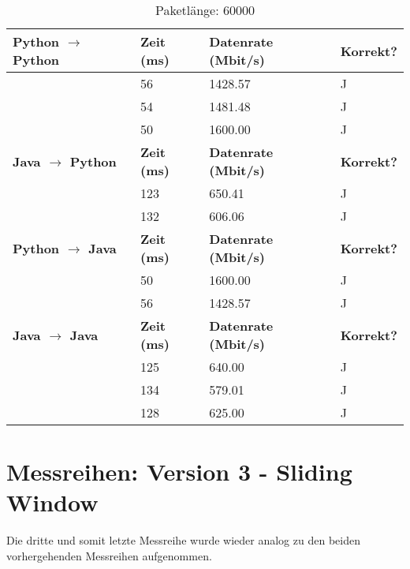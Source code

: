 \documentclass{article}
\begin{document}
    \begin{table}[]
        \caption{Paketlänge: 60000}
        \label{tab:my-tablev2_60000}
        \begin{tabular}{|l|l|l|l|}
            \hline
            \textbf{Python $\rightarrow$ Python} & \textbf{Zeit (ms)} & \textbf{Datenrate (Mbit/s)} & \textbf{Korrekt?} \\ \hline
            & 56       & 1428.57         & J        \\ \cline{2-4}
            & 54       & 1481.48         & J        \\ \cline{2-4}
            & 50       & 1600.00         & J        \\ \hline
            \textbf{Java $\rightarrow$ Python}   & \textbf{Zeit (ms)} & \textbf{Datenrate (Mbit/s)} & \textbf{Korrekt?} \\ \hline
            & 123      & 650.41          & J        \\ \cline{2-4}
            & 132      & 606.06          & J        \\ \hline
            \textbf{Python $\rightarrow$ Java}  & \textbf{Zeit (ms)} & \textbf{Datenrate (Mbit/s)} & \textbf{Korrekt?} \\ \hline
            & 50       & 1600.00         & J        \\ \cline{2-4}
            & 56       & 1428.57         & J        \\ \hline
            \textbf{Java $\rightarrow$ Java}   & \textbf{Zeit (ms)} & \textbf{Datenrate (Mbit/s)} & \textbf{Korrekt?} \\ \hline
            & 125      & 640.00          & J        \\ \cline{2-4}
            & 134      & 579.01          & J        \\ \cline{2-4}
            & 128      & 625.00          & J        \\ \hline
        \end{tabular}
    \end{table}

    \newpage

    \section{Messreihen: Version 3 - Sliding Window}
    Die dritte und somit letzte Messreihe wurde wieder analog zu den beiden vorhergehenden Messreihen aufgenommen.\\
\end{document}
